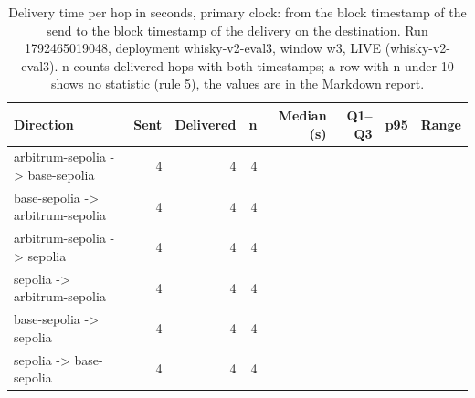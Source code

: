 \begin{table}[htbp]
    \centering
    \small
    \begin{tabular}{lrrrrrrr}
    \toprule
    Direction & Sent & Delivered & n & Median (s) & Q1--Q3 & p95 & Range \\
    \midrule
    arbitrum-sepolia -> base-sepolia & 4 & 4 & 4 &  &  &  &  \\
    base-sepolia -> arbitrum-sepolia & 4 & 4 & 4 &  &  &  &  \\
    arbitrum-sepolia -> sepolia & 4 & 4 & 4 &  &  &  &  \\
    sepolia -> arbitrum-sepolia & 4 & 4 & 4 &  &  &  &  \\
    base-sepolia -> sepolia & 4 & 4 & 4 &  &  &  &  \\
    sepolia -> base-sepolia & 4 & 4 & 4 &  &  &  &  \\
    \bottomrule
    \end{tabular}
    \caption{Delivery time per hop in seconds, primary clock: from the block timestamp of the send to the block timestamp of the delivery on the destination. Run 1792465019048, deployment whisky-v2-eval3, window w3, LIVE (whisky-v2-eval3). n counts delivered hops with both timestamps; a row with n under 10 shows no statistic (rule 5), the values are in the Markdown report.}
    \label{tab:delivery-latency-1792465019048}
\end{table}
